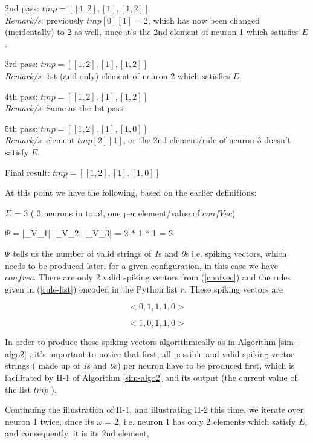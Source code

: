\documentclass{acm_proc_article-sp}
\begin{document}
2nd pass:
$tmp = [ [ 1, 2 ], [ 1 ], [ 1, 2 ] ]$\\
\textit{Remark/s}: previously $tmp[ 0 ][ 1 ] = 2$, which has
now been changed (incidentally) to 2 as well, since
it's the 2nd element of neuron 1 which satisfies $E$.

3rd pass:
$tmp = [ [ 1, 2 ], [ 1 ], [ 1, 2 ] ]$\\
\textit{Remark/s}: 1st (and only) element of neuron 2 which
satisfies $E$.

4th pass:
$tmp = [ [ 1, 2 ], [ 1 ], [ 1, 2 ] ]$\\
\textit{Remark/s}: Same as the 1st pass

5th pass:
$tmp = [ [ 1, 2 ], [ 1 ], [ 1, 0 ] ]$\\
\textit{Remark/s}: element $tmp[ 2 ][ 1 ]$, or the 2nd
element/rule of neuron 3 doesn't satisfy $E$.

Final result:
$tmp = [ [ 1, 2 ], [ 1 ], [ 1, 0 ] ]$

At this point we have the following, based on the
earlier definitions:

$\Sigma$ = 3 ( 3 neurons in total, one per element/value of
$confVec$)

$\Psi$ = |\sigma_V_1| |\sigma_V_2| |\sigma_V_3| = 2 * 1 * 1 = 2

$\Psi$ tells us the number of valid strings of \textit{1}s and \textit{0}s i.e.
spiking vectors, which needs to be produced later, for a
given configuration, in this case we have $confvec$. There are only
2 valid spiking vectors from (\ref{confvec}) and the
rules given in (\ref{rule-list}) encoded in the Python list $r$. These spiking vectors are

\begin{equation}\label{sk-211-1}
< 0, 1, 1, 1, 0>
\end{equation}

\begin{equation}\label{sk-211-2}
< 1, 0, 1, 1, 0>
\end{equation}

In order to produce these spiking vectors algorithmically as in Algorithm \ref{sim-algo2} , it's
important to notice that first, all possible and valid spiking
vector strings ( made up of \textit{1}s and \textit{0}s) per neuron have to be
produced first, which is facilitated by II-1 of Algorithm \ref{sim-algo2} and its output (the
current value of the list $tmp$ ).

Continuing the illustration of II-1, and illustrating II-2 this time, we iterate over neuron 1 twice, since its $\omega$ = 2, i.e. neuron 1 has only 2 elements which satisfy $E$, and consequently, it is its 2nd element,
\end{document}
